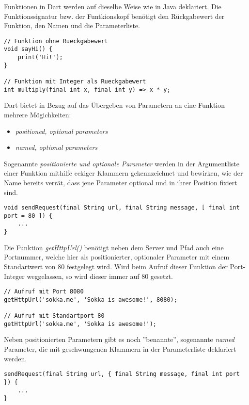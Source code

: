 Funktionen in Dart werden auf dieselbe Weise wie in Java deklariert. Die Funktionssignatur 
bzw. der Funtkionskopf benötigt den Rückgabewert der Funktion, den Namen und die Parameterliste.

\begin{lstlisting}
// Funktion ohne Rueckgabewert
void sayHi() {
    print('Hi!');
}

// Funktion mit Integer als Rueckgabewert
int multiply(final int x, final int y) => x * y;
\end{lstlisting}

Dart bietet in Bezug auf das Übergeben von Parametern an eine Funktion mehrere Mögichkeiten:
\begin{itemize}
    \item \textit{positioned, optional parameters}
    \item \textit{named, optional parameters}
\end{itemize}

Sogenannte \textit{positionierte und optionale Parameter} werden in der Argumentliste einer Funktion
mithilfe eckiger Klammern gekennzeichnet und bewirken, wie der Name bereits verrät, dass jene Parameter
optional und in ihrer Position fixiert sind.

\begin{lstlisting}
void sendRequest(final String url, final String message, [ final int port = 80 ]) {
    ...
}
\end{lstlisting}

Die Funktion \textit{getHttpUrl()} benötigt neben dem Server und Pfad auch eine Portnummer, welche
hier als positionierter, optionaler Parameter mit einem Standartwert von 80 festgelegt wird.
Wird beim Aufruf dieser Funktion der Port-Integer weggelassen, so wird dieser immer auf 80 gesetzt.

\begin{lstlisting}
// Aufruf mit Port 8080
getHttpUrl('sokka.me', 'Sokka is awesome!', 8080);

// Aufruf mit Standartport 80
getHttpUrl('sokka.me', 'Sokka is awesome!');
\end{lstlisting}

Neben positionierten Parametern gibt es noch ''benannte'', sogenannte \textit{named} Parameter, 
die mit geschwungenen Klammern in der Parameterliste deklariert werden.\\

\begin{lstlisting}
sendRequest(final String url, { final String message, final int port }) {
    ...
}
\end{lstlisting}

